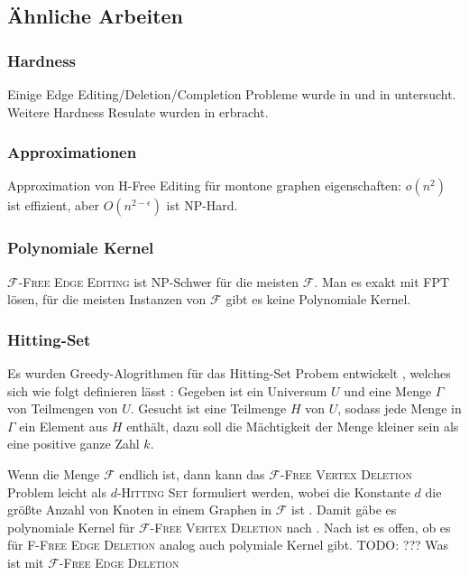 \documentclass[12pt,a4paper,onecolumn,oneside,titlepage]{article}
\newcommand\cursive[1]{\ensuremath{\mathcal{#1}}}
\begin{document}
\subsection{Ähnliche Arbeiten}
\subsubsection{Hardness}
Einige Edge Editing/Deletion/Completion Probleme wurde in \cite{Natanzon01} und in untersucht. Weitere Hardness Resulate wurden in \cite{Burzyn06} erbracht.


\subsubsection{Approximationen}
Approximation von H-Free Editing für montone graphen eigenschaften: $o(n^2)$ ist effizient, aber $O(n^{2-\epsilon})$ ist NP-Hard.\cite{Alon09}

\subsubsection{Polynomiale Kernel}

\textsc{\cursive{F}-Free Edge Editing} ist NP-Schwer für die meisten \cursive{F}. Man es exakt mit FPT lösen\cite{Cai96}, für die meisten Instanzen von \cursive{F} gibt es keine Polynomiale Kernel.

\subsubsection{Hitting-Set}
Es wurden Greedy-Alogrithmen für das Hitting-Set Probem entwickelt \cite{Moreno13}, welches sich wie folgt definieren lässt \cite{Karp72}: Gegeben ist ein Universum $U$ und eine Menge $\Gamma$ von Teilmengen von $U$. Gesucht ist eine Teilmenge $H$ von $U$, sodass jede Menge in $\Gamma$ ein Element aus $H$ enthält, dazu soll die Mächtigkeit der Menge kleiner sein als eine positive ganze Zahl $k$.

Wenn die Menge \cursive{F} endlich ist, dann kann das \textsc{\cursive{F}-Free Vertex Deletion} Problem leicht als \textsc{$d$-Hitting Set} formuliert werden, wobei die Konstante $d$ die größte Anzahl von Knoten in einem Graphen in \cursive{F} ist \cite{Kratsch13}. Damit gäbe es polynomiale Kernel für \textsc{\cursive{F}-Free Vertex Deletion} nach \cite{Abu07}.
Nach \cite{Bodlaender06} ist es offen, ob es für \textsc{F-Free Edge Deletion} analog auch polymiale Kernel gibt. TODO: ??? Was ist mit \textsc{\cursive{F}-Free Edge Deletion}
\end{document}
